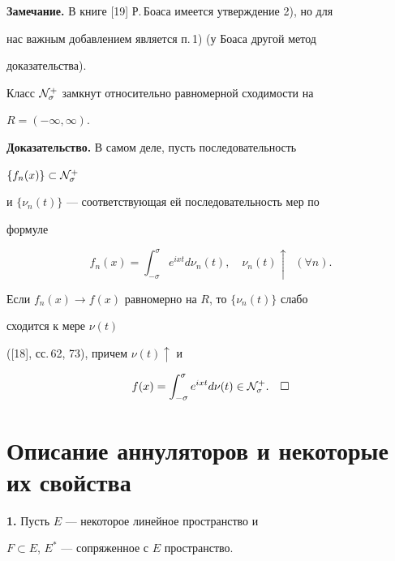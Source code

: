  


{\bf Замечание.} В книге [19] Р.\,Боаса имеется утверждение 2), но для 


нас важным добавлением является п.\,1) (у Боаса другой метод 


доказательства). 


 


\begin{lem} 


Класс $\cal N^+_\sigma$ замкнут относительно равномерной сходимости на 


$R=(-\infty,\infty)$. 


\end{lem} 


 


{\bf Доказательство.} В самом деле, пусть последовательность 


$\{f_n(x)\}\subset\cal N^+_\sigma$ 


и $\{\nu_n(t)\}$ --- соответствующая ей последовательность мер по 


формуле 


$$ 


f_n(x)=\int^\sigma_{-\sigma}e^{ixt}d\nu_n(t), 


\quad \nu_n(t)\uparrow\ \; (\forall n). 


$$ 


Если $f_n(x)\to f(x)$ равномерно на $R$, то $\{\nu_n(t)\}$ слабо 


сходится к мере $\nu(t)$ 


([18], сс.\,62, 73), причем $\nu(t)\uparrow$ и 


$$ 


f(x)=\int^\sigma_{-\sigma}e^{ixt}d\nu(t)\in\cal N^+_\sigma. 


\quad\square 


$$ 


 


\section{Описание аннуляторов и некоторые их свойства} 


 


{\bf 1.} Пусть $E$ --- некоторое линейное пространство и 


$F\subset E$, $E^*$ --- сопряженное с $E$ пространство. 


